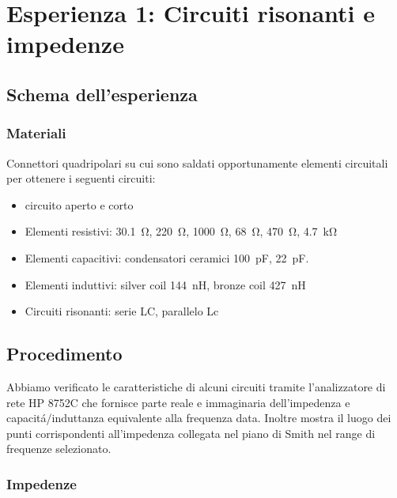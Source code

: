 \documentclass[main.tex]{subfiles}
\begin{document}

\chapter{Esperienza 1: Circuiti risonanti e impedenze}

\section{Schema dell'esperienza}

\subsection{Materiali}

Connettori quadripolari su cui sono saldati opportunamente elementi circuitali per ottenere i seguenti circuiti:

\begin{itemize}
\item circuito aperto e corto
\item Elementi resistivi: \SI{30.1}{\ohm}, \SI{220}{\ohm}, \SI{1000}{\ohm}, \SI{68}{\ohm}, \SI{470}{\ohm}, \SI{4.7}{\kilo\ohm}
\item Elementi capacitivi: condensatori ceramici  \SI{100}{\pico\farad}, \SI{22}{\pico\farad}.
\item Elementi induttivi: silver coil \SI{144}{\nano\henry}, bronze coil \SI{427}{\nano\henry} 
\item Circuiti risonanti: serie LC, parallelo Lc
\end{itemize}

\section{Procedimento}

Abbiamo verificato le caratteristiche di alcuni circuiti tramite l'analizzatore di rete HP 8752C che fornisce parte reale e immaginaria dell'impedenza e capacit\'a/induttanza equivalente alla frequenza data. Inoltre mostra il luogo dei punti corrispondenti all'impedenza collegata nel piano di Smith nel range di frequenze selezionato.

\subsection{Impedenze}
\end{document}
